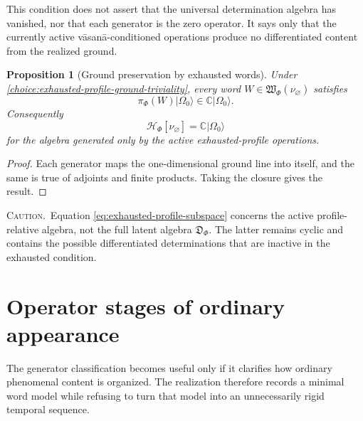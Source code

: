 \documentclass[11pt,reqno]{scrartcl}
\newcommand{\CC}{\mathbb C}
\newcommand{\piF}{\pi_{\Phi}}
\newcommand{\ket}[1]{\lvert #1\rangle}
\newcommand{\warninglabel}{\par\smallskip\noindent\textsc{Caution.}\ }
\newcommand{\detAlg}{\mathfrak D_{\Phi}}
\newcommand{\vasEmpty}{\nu_{\varnothing}}
\newcommand{\wordSet}{\mathfrak W_{\Phi}}
\newcommand{\HvasEmpty}{\mathscr H_{\Phi}[\nu_{\varnothing}]}
\theoremstyle{plain}
\newtheorem{proposition}[proposition]{Proposition}
\theoremstyle{definition}
\theoremstyle{remark}
\begin{document}
This condition does not assert that the universal determination algebra has
vanished, nor that each generator is the zero operator.  It says only that the
currently active v\=asan\=a-conditioned operations produce no differentiated
content from the realized ground.

\begin{proposition}[Ground preservation by exhausted words]
\label{prop:exhausted-words-ground-preserve}
Under \cref{choice:exhausted-profile-ground-triviality}, every word
$W\in\wordSet(\vasEmpty)$ satisfies
\begin{equation}
  \piF(W)\ket{\Omega_0}
  \in\CC\ket{\Omega_0}.
  \label{eq:exhausted-word-ground-line}
\end{equation}
Consequently
\begin{equation}
  \HvasEmpty=\CC\ket{\Omega_0}
  \label{eq:exhausted-profile-subspace}
\end{equation}
for the algebra generated only by the active exhausted-profile operations.
\end{proposition}

\begin{proof}
Each generator maps the one-dimensional ground line into itself, and the same
is true of adjoints and finite products.  Taking the closure gives the result.
\end{proof}

\warninglabel Equation \eqref{eq:exhausted-profile-subspace} concerns the
active profile-relative algebra, not the full latent algebra $\detAlg$.  The
latter remains cyclic and contains the possible differentiated determinations
that are inactive in the exhausted condition.
\section{Operator stages of ordinary appearance}
\label{sec:operator-stages-appearance}

The generator classification becomes useful only if it clarifies how ordinary
phenomenal content is organized.  The realization therefore records a minimal
word model while refusing to turn that model into an unnecessarily rigid
temporal sequence.
\end{document}
